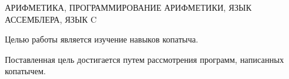 \begin{essay}{}
АРИФМЕТИКА, ПРОГРАММИРОВАНИЕ АРИФМЕТИКИ, ЯЗЫК АССЕМБЛЕРА, ЯЗЫК C

Целью работы является изучение навыков копатыча.

Поставленная цель достигается путем рассмотрения программ, написанных копатычем.

\end{essay}

